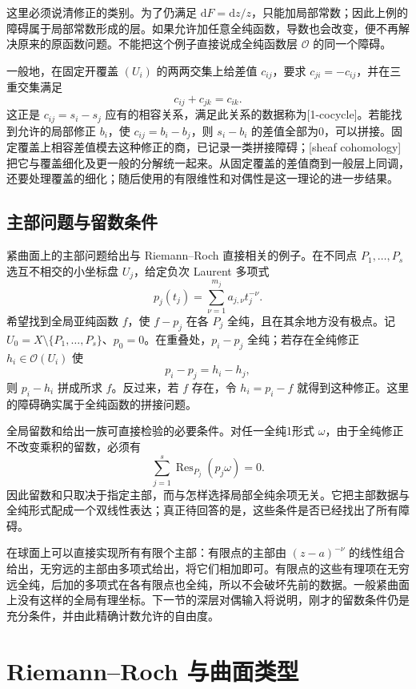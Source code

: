\ProseParagraphBreak
这里必须说清修正的类别。为了仍满足 \(\mathrm{d}F=\mathrm{d}z/z\)，只能加局部常数；因此上例的障碍属于局部常数形成的层。如果允许加任意全纯函数，导数也会改变，便不再解决原来的原函数问题。不能把这个例子直接说成全纯函数层 \(\mathcal O\) 的同一个障碍。

\ProseParagraphBreak
一般地，在固定开覆盖 \((U_i)\) 的两两交集上给差值 \(c_{ij}\)，要求 \(c_{ji}=-c_{ij}\)，并在三重交集满足
\[
 c_{ij}+c_{jk}=c_{ik}.
\]
这正是 \(c_{ij}=s_i-s_j\) 应有的相容关系，满足此关系的数据称为[1-cocycle]。若能找到允许的局部修正 \(b_i\)，使 \(c_{ij}=b_i-b_j\)，则 \(s_i-b_i\) 的差值全部为0，可以拼接。固定覆盖上相容差值模去这种修正的商，已记录一类拼接障碍；[sheaf cohomology]把它与覆盖细化及更一般的分解统一起来。从固定覆盖的差值商到一般层上同调，还要处理覆盖的细化；随后使用的有限维性和对偶性是这一理论的进一步结果。

\subsection{主部问题与留数条件}
\label{b3:subsec:A0503}

紧曲面上的主部问题给出与 Riemann--Roch 直接相关的例子。在不同点 \(P_1,\ldots,P_s\) 选互不相交的小坐标盘 \(U_j\)，给定负次 Laurent 多项式
\[
 p_j(t_j)=\sum_{\nu=1}^{m_j}a_{j,\nu}t_j^{-\nu}.
\]
希望找到全局亚纯函数 \(f\)，使 \(f-p_j\) 在各 \(P_j\) 全纯，且在其余地方没有极点。记 \(U_0=X\setminus\{P_1,\ldots,P_s\}\)、\(p_0=0\)。在重叠处，\(p_i-p_j\) 全纯；若存在全纯修正 \(h_i\in\mathcal O(U_i)\) 使
\[
 p_i-p_j=h_i-h_j,
\]
则 \(p_i-h_i\) 拼成所求 \(f\)。反过来，若 \(f\) 存在，令 \(h_i=p_i-f\) 就得到这种修正。这里的障碍确实属于全纯函数的拼接问题。

\ProseParagraphBreak
全局留数和给出一族可直接检验的必要条件。对任一全纯1形式 \(\omega\)，由于全纯修正不改变乘积的留数，必须有
\[
 \sum_{j=1}^s\operatorname{Res}_{P_j}(p_j\omega)=0.
\]
因此留数和只取决于指定主部，而与怎样选择局部全纯余项无关。它把主部数据与全纯形式配成一个双线性表达；真正待回答的是，这些条件是否已经找出了所有障碍。

\ProseParagraphBreak
在球面上可以直接实现所有有限个主部：有限点的主部由 \((z-a)^{-\nu}\) 的线性组合给出，无穷远的主部由多项式给出，将它们相加即可。有限点的这些有理项在无穷远全纯，后加的多项式在各有限点也全纯，所以不会破坏先前的数据。一般紧曲面上没有这样的全局有理坐标。下一节的深层对偶输入将说明，刚才的留数条件仍是充分条件，并由此精确计数允许的自由度。

\section{Riemann--Roch 与曲面类型}
\label{b3:sec:A06}

